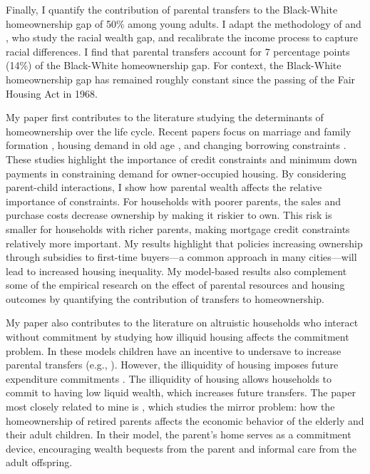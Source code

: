 \documentclass[12pt]{article}
\begin{document}
Finally, I quantify the contribution of parental transfers to the Black-White homeownership gap of 50\% among young adults. I adapt the methodology of \cite{Ashman2020} and \cite{aliprantis2022dynamics}, who study the racial wealth gap, and recalibrate the income process to capture racial differences. I find that parental transfers account for 7 percentage points (14\%) of the Black-White homeownership gap. For context, the Black-White homeownership gap has remained roughly constant since the passing of the Fair Housing Act in 1968.




My paper first contributes to the literature studying the determinants of homeownership over the life cycle. Recent papers focus on marriage and family formation \citep{Fisher2011,Chang2024,Khorunzhina2019}, housing demand in old age \citep{McGee2019,Barczyk2020a}, and changing borrowing constraints \citep{Paz-Pardo2019,Mabille2020}. These studies highlight the importance of credit constraints and minimum down payments in constraining demand for owner-occupied housing. By considering parent-child interactions, I show how parental wealth affects the relative importance of constraints. For households with poorer parents, the sales and purchase costs decrease ownership by making it riskier to own. This risk is smaller  for households with richer parents, making mortgage credit constraints relatively more important. My results highlight that policies increasing ownership through subsidies to first-time buyers---a common approach in many cities---will lead to increased housing inequality. My model-based results also complement some of the empirical research on the effect of parental resources and housing outcomes \citep[see e.g.,][ for recent work]{wold2024housing,daysal2023intergenerational,benetton2022dynastic} by quantifying the contribution of transfers to homeownership.

My paper also contributes to the literature on altruistic households who interact without commitment by studying how illiquid housing affects the commitment problem. In these models children have an incentive to undersave to increase parental transfers (e.g., \citealp{Altonji1997a,Boar2018,Barczyk2014,Chu2020}). However, the illiquidity of housing imposes future expenditure commitments \citep{Chetty2007,Shore2010}. The illiquidity of housing allows households to commit to having low liquid wealth, which increases future transfers. The paper most closely related to mine is \cite{Barczyk2020a}, which studies the mirror problem: how the homeownership of retired parents affects the economic behavior of the elderly and their adult children. In their model, the parent’s home serves as a commitment device, encouraging wealth bequests from the parent and informal care from the adult offspring.
\end{document}
